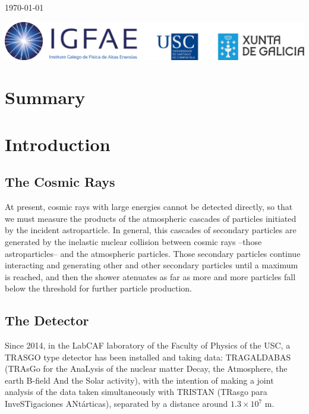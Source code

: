\documentclass[a4paper]{book}
\begin{document}
\begin{titlepage}
	\vfill


	{\large \today\par}
\end{titlepage}


\thispagestyle{empty}
\vfill
\includegraphics[scale=0.25]{LogoIGFAE}


\tableofcontents

\chapter{Summary}

\hspace{13pt} 


\chapter{Introduction}


\section{The Cosmic Rays}

At present, cosmic rays with large energies cannot be detected directly, so that we must measure the products of the atmospheric cascades of particles initiated by the incident astroparticle. In general, this cascades of secondary particles are generated by the inelastic nuclear collision between cosmic rays --those astroparticles-- and the atmospheric particles. Those secondary particles continue interacting and generating other and other secondary particles until a maximum is reached, and then the shower atenuates as far as more and more particles fall below the threshold for further particle production.

\section{The Detector}

Since 2014, in the LabCAF laboratory of the Faculty of Physics of the USC, a TRASGO type detector has been installed and taking data: TRAGALDABAS (TRAsGo for the AnaLysis of the nuclear matter Decay, the Atmosphere, the earth B-field And the Solar activity), with the intention of making a joint analysis of the data taken simultaneously with TRISTAN (TRasgo para InveSTigaciones ANtárticas), separated by a distance around $1.3 \times 10^7$ m.
\end{document}
